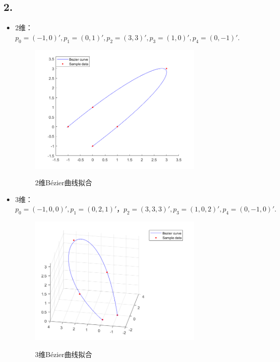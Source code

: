 \documentclass[utf8]{ctexart}
\begin{document}
\subsection*{2.}
\begin{itemize}
    \item 2维：$p_0 = (-1,0)',
    p_1 = (0,1)',
    p_2 = (3,3)',
    p_3 = (1,0)',
    p_4 = (0,-1)'.$

    \begin{figure}[H]
        \centering
        \includegraphics[width=0.8\textwidth]{bezierFit_2d.png}
        \label{fig3}
        \caption{2维Bézier曲线拟合}
    \end{figure}

    \item 3维：$p_0 = (-1,0,0)',
    p_1 = (0,2,1)'，
    p_2 = (3,3,3)',
    p_3 = (1,0,2)',
    p_4 = (0,-1,0)'.$
    \begin{figure}[H]
        \centering
        \includegraphics[width=0.8\textwidth]{bezierFit_3d.png}
        \label{fig4}
        \caption{3维Bézier曲线拟合}
    \end{figure}
\end{itemize}
\end{document}
